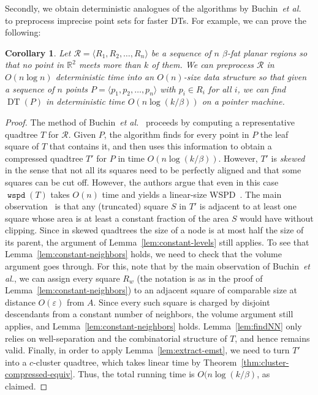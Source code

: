 \documentclass[11pt]{paper}
\newcommand {\mathset} [1] {\ensuremath {\mathbb {#1}}}
\newcommand {\R} {\mathset {R}}
\newcommand {\etal} {\textit {et al.}}
\newcommand {\eps} {\varepsilon}
\DeclareMathOperator {\wspd}{\texttt{wspd}}
\DeclareMathOperator {\DT}{DT}
\newtheorem {cor}[theorem] {Corollary}
\begin{document}
  Secondly, we obtain deterministic analogues of the algorithms by
  Buchin~\etal~\cite {BuchinLoMoMuXX} to preprocess imprecise point sets
  for faster DTs. For example, we can prove the following:
  \begin {cor}\label{cor:IDT}
    Let $\mathcal{R} = \langle R_1, R_2, \ldots, R_n\rangle$ be
    a sequence of 
    $n$ $\beta$-fat
    planar regions so that 
    no point in $\R^2$ 
    meets more than $k$ of them. 
    We can preprocess $\mathcal{R}$ in $O(n \log n)$
    deterministic time into an $O(n)$-size data structure
    so that given a sequence of  $n$ points 
    $P = \langle p_1, p_2, \ldots, p_n \rangle$ 
    with $p_i \in R_i$ for all $i$, we can find $\DT(P)$
    in deterministic time $O(n \log(k/\beta))$ on a pointer
    machine.
  \end {cor}

\begin{proof}
    The method of
    Buchin~\etal~\cite[Theorem~4.3 and Corollary~5.6]{BuchinLoMoMuXX}
    proceeds by computing a
    representative quadtree $T$ for $\mathcal{R}$.
    Given $P$, the algorithm finds for every point in $P$
    the leaf square of $T$ that contains it, and then uses this
    information to obtain a compressed quadtree $T'$ for $P$ in time
    $O(n \log(k/\beta))$. However, $T'$ is \emph{skewed}
    in the sense that not all its squares need to be perfectly
    aligned and that some squares can be cut off.
    However, the authors argue
    that even in this case $\wspd(T)$ takes $O(n)$ time and
    yields a linear-size WSPD~\cite[Appendix~B]{BuchinLoMoMuXX}.
    The main observation~\cite[Observation~B.1]{BuchinLoMoMuXX}
    is that any (truncated) square $S$ in $T'$ is adjacent to at least
    one square whose area is at least a constant fraction of the
    area $S$ would have without clipping.
    Since in skewed quadtrees the size of a node is at most half
    the size of its parent, the argument of Lemma~\ref{lem:constant-levels}
    still applies.
    To see that Lemma~\ref{lem:constant-neighbors} holds,
    we need to check that the volume argument goes through.
    For this, note that by the main observation of Buchin~\etal, we
    can assign every square $R_w$ (the notation is as in the proof of
    Lemma~\ref{lem:constant-neighbors}) to an adjacent square of
    comparable size at distance $O(\eps)$ from $A$. Since every such
    square is charged by disjoint descendants from a constant number of
    neighbors, the volume argument still applies, and
    Lemma~\ref{lem:constant-neighbors} holds. Lemma~\ref{lem:findNN}
    only relies on well-separation and the combinatorial structure of
    $T$, and hence remains valid.
    Finally, in order to apply Lemma~\ref{lem:extract-emst},
    we need to turn $T'$ into a $c$-cluster quadtree,
    which takes linear time by Theorem~\ref{thm:cluster-compressed-equiv}.
    Thus, the total running time is $O(n \log(k/\beta)$, as claimed.
\end{proof}
\end{document}
